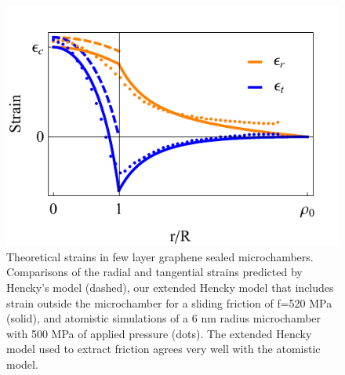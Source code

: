 \begin{figure}
\begin{center}
\includegraphics{Figs_Friction/Figure_3.pdf}
\end{center}
\caption{\label{theory} Theoretical strains in few layer graphene sealed microchambers. Comparisons of the radial and tangential strains predicted by Hencky's model (dashed), our extended Hencky model that includes strain outside the microchamber for a sliding friction of f=520 MPa (solid), and atomistic simulations of a 6 nm radius microchamber with 500 MPa of applied pressure (dots). The extended Hencky model used to extract friction agrees very well with the atomistic model.}
\end{figure}

